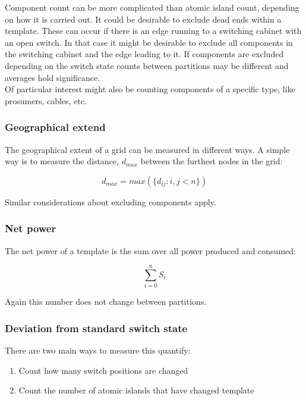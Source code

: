 Component count can be more complicated than atomic island count, depending on how
it is carried out. It could be desirable to exclude dead ends within a template.
These can occur if there is an edge running to a switching cabinet with an open switch. 
In that case it might be desirable to exclude all components in the switching cabinet
and the edge leading to it. If components are excluded depending on the switch state 
counts between partitions may be different and averages hold significance.\\
Of particular interest might
also be counting components of a specific type, like prosumers, cables, etc.

\subsubsection{Geographical extend}

The geographical extent of a grid can be measured in different ways. A simple way is to
measure the distance, $d_{max}$ between the furthest nodes in the grid:

\begin{equation}
  d_{max} = max(\{d_{ij} : i, j < n\})
  \label{eq:measures:geo_extend}
\end{equation}

Similar considerations about excluding components apply.

\subsubsection{Net power}

The net power of a template is the sum over all power produced and consumed:

\begin{equation}
  \sum_{i = 0}^n S_i
\end{equation}

Again this number does not change between partitions.

\subsubsection{Deviation from standard switch state}

There are two main ways to measure this quantify:

\begin{enumerate}
  \item Count how many switch positions are changed
  \item Count the number of atomic islands that have changed template
\end{enumerate}

